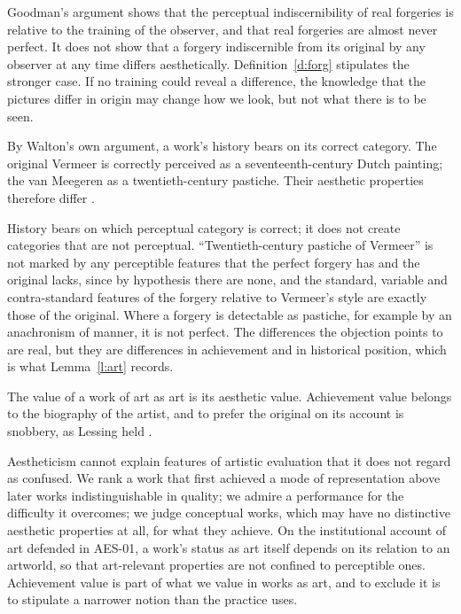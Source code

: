 \documentclass{situationist-preprint}
\begin{document}
\begin{reply}
Goodman's argument shows that the perceptual indiscernibility of real forgeries is relative to the training of the observer, and that real forgeries are almost never perfect. It does not show that a forgery indiscernible from its original by any observer at any time differs aesthetically. Definition~\ref{d:forg} stipulates the stronger case. If no training could reveal a difference, the knowledge that the pictures differ in origin may change how we look, but not what there is to be seen.
\end{reply}

\begin{objection}[Categories]\label{o:walton}
By Walton's own argument, a work's history bears on its correct category. The original Vermeer is correctly perceived as a seventeenth-century Dutch painting; the van Meegeren as a twentieth-century pastiche. Their aesthetic properties therefore differ \citep{Walton1970}.
\end{objection}

\begin{reply}
History bears on which perceptual category is correct; it does not create categories that are not perceptual. \enquote{Twentieth-century pastiche of Vermeer} is not marked by any perceptible features that the perfect forgery has and the original lacks, since by hypothesis there are none, and the standard, variable and contra-standard features of the forgery relative to Vermeer's style are exactly those of the original. Where a forgery is detectable as pastiche, for example by an anachronism of manner, it is not perfect. The differences the objection points to are real, but they are differences in achievement and in historical position, which is what Lemma~\ref{l:art} records.
\end{reply}

\begin{objection}[Aestheticism]\label{o:formal}
The value of a work of art as art is its aesthetic value. Achievement value belongs to the biography of the artist, and to prefer the original on its account is snobbery, as Lessing held \citep{Lessing1965}.
\end{objection}

\begin{reply}
Aestheticism cannot explain features of artistic evaluation that it does not regard as confused. We rank a work that first achieved a mode of representation above later works indistinguishable in quality; we admire a performance for the difficulty it overcomes; we judge conceptual works, which may have no distinctive aesthetic properties at all, for what they achieve. On the institutional account of art defended in AES-01, a work's status as art itself depends on its relation to an artworld, so that art-relevant properties are not confined to perceptible ones. Achievement value is part of what we value in works as art, and to exclude it is to stipulate a narrower notion than the practice uses.
\end{reply}
\end{document}
